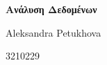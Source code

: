 \begin{titlepage}
  \centering
  \vspace*{2cm}
  
  {\Huge\bfseries Ανάλυση Δεδομένων\par}
  \vspace{1.5cm}
  

  {\Large Aleksandra Petukhova\par}
  \vspace{1cm}
 
  {\Large 3210229\par}
  \vspace{0.5cm}

  \vfill
\end{titlepage}
